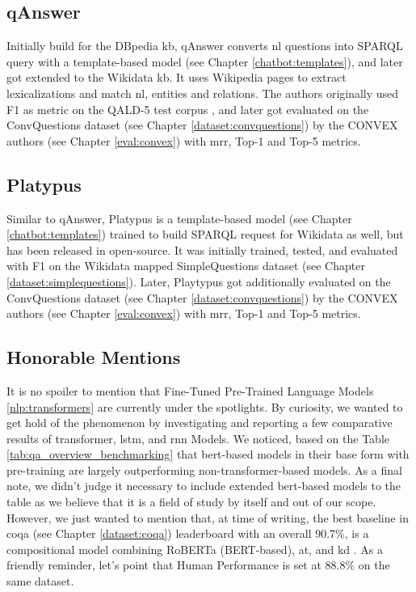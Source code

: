 \subsection{qAnswer}
\label{eval:qanswer}
Initially build for the DBpedia \gls{kb}, qAnswer converts \gls{nl} questions into SPARQL query with a template-based model (see Chapter \ref{chatbot:templates}), and later got extended to the Wikidata \gls{kb}. It uses Wikipedia pages to extract lexicalizations and match \gls{nl}, entities and relations. The authors originally used F1 as metric on the QALD-5 test corpus \autocite{paper:Lopezetal2013}, and later got evaluated on the ConvQuestions dataset (see Chapter \ref{dataset:convquestions}) by the CONVEX authors (see Chapter \ref{eval:convex}) with \gls{mrr}, Top-1 and Top-5 metrics.

\subsection{Platypus}
\label{eval:platypus}
Similar to qAnswer, Platypus \autocite{paper:InProceedingsPellissier-Tanon.P-TD-d-ACM-S_18} is a template-based model (see Chapter \ref{chatbot:templates}) trained to build SPARQL request for Wikidata as well, but has been released in open-source. It was initially trained, tested, and evaluated with F1 on the Wikidata mapped SimpleQuestions dataset (see Chapter \ref{dataset:simplequestions}). Later, Playtypus got additionally evaluated on the ConvQuestions dataset (see Chapter \ref{dataset:convquestions}) by the CONVEX authors (see Chapter \ref{eval:convex}) with \gls{mrr}, Top-1 and Top-5 metrics.

\subsection{Honorable Mentions}
It is no spoiler to mention that Fine-Tuned Pre-Trained Language Models \ref{nlp:transformers} are currently under the spotlights. By curiosity, we wanted to get hold of the phenomenon by investigating and reporting a few comparative results of \gls{transformer}, \gls{lstm}, and \gls{rnn} Models. We noticed, based on the Table \ref{tab:qa_overview_benchmarking} that \gls{bert}-based \autocite{paper:devlin-etal-2019-bert} models in their base form with pre-training are largely outperforming non-\gls{transformer}-based models. As a final note, we didn't judge it necessary to include extended \gls{bert}-based models to the table as we believe that it is a field of study by itself and out of our scope. However, we just wanted to mention that, at time of writing, the best baseline in \gls{coqa} (see Chapter \ref{dataset:coqa}) leaderboard with an overall 90.7\%, is a compositional model combining RoBERTa \autocite{paper:journals/corr/abs-1907-11692} (BERT-based), \gls{at}, and \gls{kd} \autocite{paper:2019arXiv190910772J}. As a friendly reminder, let's point that Human Performance is set at 88.8\% on the same dataset.


